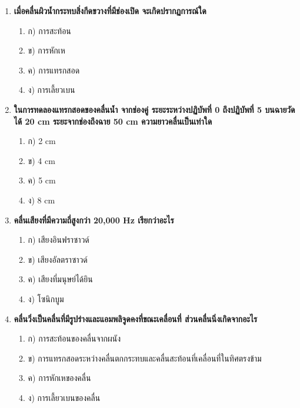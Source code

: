 \documentclass[12pt]{article}
\begin{document}
\begin{enumerate}
\begin{enumerate}
\item ก) 14.1 m/s
\item ข) 21.2 m/s
\item ค) 42.4 m/s
\item ง) 60 m/s
\end{enumerate}
\item \textbf{เมื่อคลื่นผิวน้ำกระทบสิ่งกีดขวางที่มีช่องเปิด จะเกิดปรากฏการณ์ใด}
\begin{enumerate}
\item ก) การสะท้อน
\item ข) การหักเห
\item ค) การแทรกสอด
\item ง) การเลี้ยวเบน
\end{enumerate}
\item \textbf{ในการทดลองแทรกสอดของคลื่นน้ำ จากช่องคู่ ระยะระหว่างปฏิบัพที่ 0 ถึงปฏิบัพที่ 5 บนฉายวัดได้ 20 cm ระยะจากช่องถึงฉาย 50 cm ความยาวคลื่นเป็นเท่าใด}
\begin{enumerate}
\item ก) 2 cm
\item ข) 4 cm
\item ค) 5 cm
\item ง) 8 cm
\end{enumerate}
\item \textbf{คลื่นเสียงที่มีความถี่สูงกว่า 20,000 Hz เรียกว่าอะไร}
\begin{enumerate}
\item ก) เสียงอินฟราซาวด์
\item ข) เสียงอัลตราซาวด์
\item ค) เสียงที่มนุษย์ได้ยิน
\item ง) โซนิกบูม
\end{enumerate}
\item \textbf{คลื่นวิ่งเป็นคลื่นที่มีรูปร่างและแอมพลิจูดคงที่ขณะเคลื่อนที่ ส่วนคลื่นนิ่งเกิดจากอะไร}
\begin{enumerate}
\item ก) การสะท้อนของคลื่นจากผนัง
\item ข) การแทรกสอดระหว่างคลื่นตกกระทบและคลื่นสะท้อนที่เคลื่อนที่ในทิศตรงข้าม
\item ค) การหักเหของคลื่น
\item ง) การเลี้ยวเบนของคลื่น
\end{enumerate}
\end{enumerate}
\end{document}
